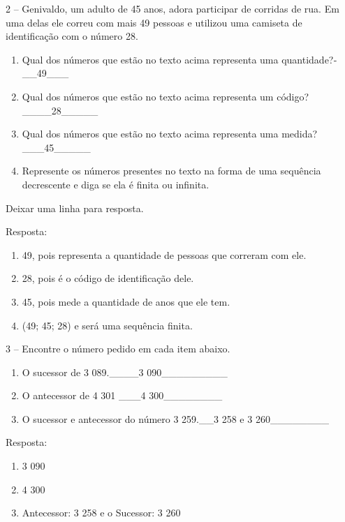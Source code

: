 2 -- Genivaldo, um adulto de 45 anos, adora participar de corridas de
rua. Em uma delas ele correu com mais 49 pessoas e utilizou uma camiseta
de identificação com o número 28.

\begin{enumerate}
\def\labelenumi{\alph{enumi})}
\item
  Qual dos números que estão no texto acima representa uma
  quantidade?­­­\_\_49\_\_\_
\item
  Qual dos números que estão no texto acima representa um
  código?\_\_\_\_28\_\_\_\_\_
\item
  Qual dos números que estão no texto acima representa uma
  medida?\_\_\_45\_\_\_\_\_
\item
  Represente os números presentes no texto na forma de uma sequência
  decrescente e diga se ela é finita ou infinita.
\end{enumerate}

Deixar uma linha para resposta.

Resposta:

\begin{enumerate}
\def\labelenumi{\alph{enumi})}
\item
  49, pois representa a quantidade de pessoas que correram com ele.
\item
  28, pois é o código de identificação dele.
\item
  45, pois mede a quantidade de anos que ele tem.
\item
  (49; 45; 28) e será uma sequência finita.
\end{enumerate}

3 -- Encontre o número pedido em cada item abaixo.

\begin{enumerate}
\def\labelenumi{\alph{enumi})}
\item
  O sucessor de 3 089.\_\_\_\_3 090\_\_\_\_\_\_\_\_\_
\item
  O antecessor de 4 301 \_\_\_4 300\_\_\_\_\_\_\_\_
\item
  O sucessor e antecessor do número 3 259.\_\_3 258 e 3
  260\_\_\_\_\_\_\_\_
\end{enumerate}

Resposta:

\begin{enumerate}
\def\labelenumi{\alph{enumi})}
\item
  3 090
\item
  4 300
\item
  Antecessor: 3 258 e o Sucessor: 3 260
\end{enumerate}

